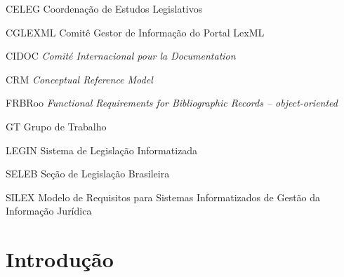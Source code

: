 \documentclass[a4paper,11pt,openright,twoside,brazil]{abntex2}
\begin{document}
\begin{siglas}
  \item[CELEG] Coordenação de Estudos Legislativos
  \item[CGLEXML] Comitê Gestor de Informação do Portal LexML
  \item[CIDOC] \emph{Comité Internacional pour la Documentation}
  \item[CRM] \emph{Conceptual Reference Model} 
  \item[FRBRoo] \emph{Functional Requirements for Bibliographic Records –
  object-oriented}
  \item[GT] Grupo de Trabalho
  \item[LEGIN] Sistema de Legislação Informatizada
  \item[SELEB] Seção de Legislação Brasileira
  \item[SILEX] Modelo de Requisitos para Sistemas Informatizados de Gestão da 
Informação Jurídica
\end{siglas}
% 


\tableofcontents*
\cleardoublepage

\textual

\addtocounter{page}{2}

\chapter{Introdução}
\end{document}
